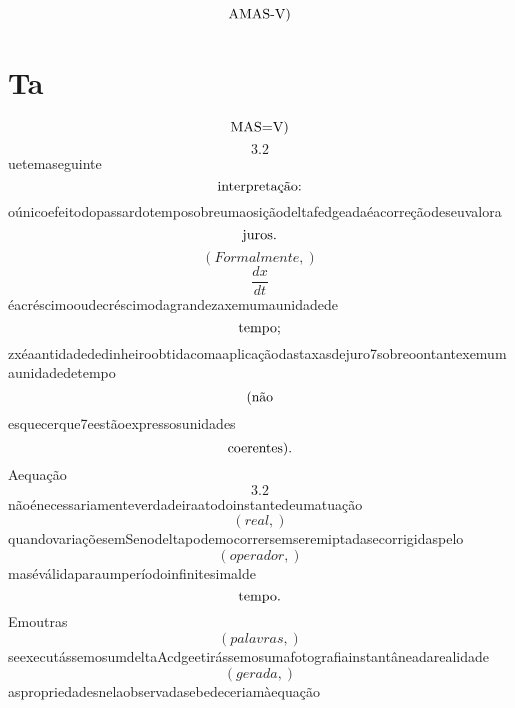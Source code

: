 \documentclass{article}
\begin{document}
\begin{equation}
$AMAS-V)$
\end{equation}\section{Ta}\begin{equation}
$MAS=V)$
\end{equation}\begin{equation}
3.2
\end{equation}uetemaseguinte\begin{equation}
$interpretação:$
\end{equation}oúnicoefeitodopassardotemposobreumaosiçãodeltafedgeadaéacorreçãodeseuvalora\begin{equation}
$juros.$
\end{equation}\begin{equation}
\left( Formalmente,\right)
\end{equation}\begin{equation}
\frac{dx}{dt}
\end{equation}éacréscimooudecréscimodagrandezaxemumaunidadede\begin{equation}
$tempo;$
\end{equation}zxéaantidadededinheiroobtidacomaaplicaçãodastaxasdejuro7sobreoontantexemumaunidadedetempo\begin{equation}
$(não$
\end{equation}esquecerque7eestãoexpressosunidades\begin{equation}
$coerentes).$
\end{equation}Aequação\begin{equation}
3.2
\end{equation}nãoénecessariamenteverdadeiraatodoinstantedeumatuação\begin{equation}
\left( real,\right)
\end{equation}quandovariaçõesemSenodeltapodemocorrersemseremiptadasecorrigidaspelo\begin{equation}
\left( operador,\right)
\end{equation}maséválidaparaumperíodoinfinitesimalde\begin{equation}
$tempo.$
\end{equation}Emoutras\begin{equation}
\left( palavras,\right)
\end{equation}seexecutássemosumdeltaAcdgeetirássemosumafotografiainstantâneadarealidade\begin{equation}
\left( gerada,\right)
\end{equation}aspropriedadesnelaobservadasebedeceriamàequação\begin{equation}

\end{equation}
\end{document}
